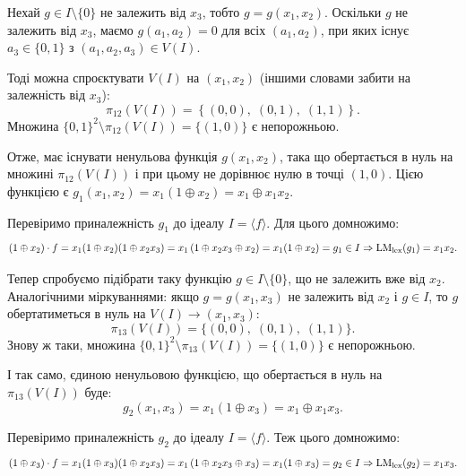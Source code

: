Нехай $g \in I \setminus \{0\}$ не залежить від $x_3$, тобто $g = g(x_1, x_2)$. Оскільки $g$ не залежить від $x_3$, 
маємо $g(a_1, a_2) = 0$ для всіх $(a_1, a_2)$, при яких існує $a_3 \in \{0,1\}$ з $(a_1, a_2, a_3) \in V(I)$.

Тоді можна спроєктувати $V(I)$ на $(x_1, x_2)$ (іншими словами забити на залежність від $x_{3}$):
\begin{equation*}
    \pi_{12}\left(V(I)\right)
    = \left\{(0,0),\; (0,1),\; (1,1)\right\}.
\end{equation*}
Множина $\{0,1\}^2 \setminus \pi_{12}(V(I)) = \{(1,0)\}$ є непорожньою.

Отже, має існувати ненульова функція $g(x_1,x_2)$, така що обертається в нуль на множині $\pi_{12}(V(I))$ і при 
цьому не дорівнює нулю в точці $(1,0)$. Цією функцією є $g_{1}(x_1, x_2) = x_1(1 \oplus x_2) = x_1 \oplus x_1 x_2$.

Перевіримо приналежність $g_1$ до ідеалу $I = \langle f \rangle$. Для цього домножимо:
\begin{equation*}
    (1 \oplus x_{2}) \cdot f
    = x_1(1 \oplus x_2)(1 \oplus x_2 x_3)
    = x_1\left(1 \oplus x_2 x_3 \oplus x_2\right)
    = x_1(1 \oplus x_2) = g_1 \in I \Rightarrow \mathrm{LM}_{\mathrm{lex}}(g_1) = x_1 x_2.
\end{equation*}

Тепер спробуємо підібрати таку функцію $g \in I \setminus \{0\}$, що не залежить вже від $x_2$. Аналогічними 
міркуваннями: якщо $g = g(x_1, x_3)$ не залежить від $x_2$ і $g \in I$, то $g$ обертатиметься в нуль на 
$V(I) \rightarrow (x_1, x_3)$:
\begin{equation*}
    \pi_{13}\left(V(I)\right)
    = \big\{(0,0),\; (0,1),\; (1,1)\big\}.
\end{equation*}
Знову ж таки, множина $\{0,1\}^2 \setminus \pi_{13}(V(I)) = \{(1,0)\}$ є непорожньою.

І так само, єдиною ненульовою функцією, що обертається в нуль на $\pi_{13}(V(I))$ буде:
\begin{equation*}
    g_2(x_1, x_3) = x_1(1 \oplus x_3) = x_1 \oplus x_1 x_3.
\end{equation*}

Перевіримо приналежність $g_2$ до ідеалу $I = \langle f \rangle$. Теж цього домножимо:
\begin{equation*}
    (1 \oplus x_3) \cdot f
    = x_1(1 \oplus x_3)(1 \oplus x_2 x_3)
    = x_1\left(1 \oplus x_2 x_3 \oplus x_3\right)
    = x_1(1 \oplus x_3) = g_2 \in I \Rightarrow \mathrm{LM}_{\mathrm{lex}}(g_2) = x_1 x_3.
\end{equation*}

